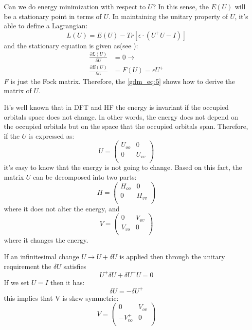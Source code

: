 Can we do energy minimization with respect to $U$? In this sense, the $E(U)$ will be a 
stationary point in terms of $U$. In maintaining the unitary property of $U$, it's able 
to define a Lagrangian:
\begin{equation}\label{gdm_eq:4}
 L(U) = E(U) - Tr[\epsilon\cdot (U^{+}U-I)]
\end{equation}
and the stationary equation is given as(see \cite{doi:10.1137/S0895479895290954}):
\begin{align}\label{gdm_eq:5}
 \frac{\partial L(U)}{\partial U} &= 0 \rightarrow   \nonumber \\
 \frac{\partial E(U)}{\partial U} & = F(U) = \epsilon U^{+} 
\end{align}
$F$ is just the Fock matrix. Therefore, the \ref{gdm_eq:5} shows how to derive the matrix
of $U$.

It's well known that in DFT and HF the energy is invariant if the occupied orbitals space 
does not change. In other words, the energy does not depend on the occupied orbitals
but on the space that the occupied orbitals span. Therefore, if the $U$ is expressed as:
\begin{equation}
 U = 
 \begin{pmatrix}
 U_{oo}  &  0  \\
 0       &  U_{vv} \\
 \end{pmatrix}
\end{equation}
it's easy to know that the energy is not going to change. Based on this fact, the matrix
$U$ can be decomposed into two parts:
\begin{equation}
  H = 
 \begin{pmatrix}
 H_{oo}  &  0  \\
 0       &  H_{vv} \\
 \end{pmatrix}
\end{equation}
where it does not alter the energy, and 
\begin{equation}
  V = 
 \begin{pmatrix}
 0        &  V_{ov}  \\
 V_{vo}   &  0       \\
 \end{pmatrix}
\end{equation}
where it changes the energy.

If an infinitesimal change $U \rightarrow U + \delta U$ is applied then through the 
unitary requirement the $\delta U$ satisfies 
\begin{equation}
 U^{+}\delta U + \delta U^{+} U = 0
\end{equation}
If we set $U = I$ then it has:
\begin{equation}\label{gdm_eq:6}
 \delta U =-\delta U^{+}
\end{equation}
this implies that V is skew-symmetric:
\begin{equation}\label{gdm_eq:7}
  V = 
 \begin{pmatrix}
 0            &  V_{ov}  \\
-V^{+}_{vo}   &  0       \\
 \end{pmatrix}
\end{equation}

